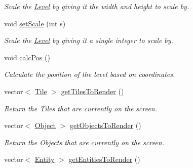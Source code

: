 \begin{DoxyCompactItemize}
\begin{DoxyCompactList}\small\item\em Scale the \hyperlink{classLevel}{Level} by giving it the width and height to scale by. \end{DoxyCompactList}\item 
void \hyperlink{classLevel_af6fe8bc2dd6623fcbaa739403a239d77}{set\+Scale} (int s)\hypertarget{classLevel_af6fe8bc2dd6623fcbaa739403a239d77}{}\label{classLevel_af6fe8bc2dd6623fcbaa739403a239d77}

\begin{DoxyCompactList}\small\item\em Scale the \hyperlink{classLevel}{Level} by giving it a single integer to scale by. \end{DoxyCompactList}\item 
void \hyperlink{classLevel_a02e915f95e181dcfe95553e923a73a39}{calc\+Pos} ()\hypertarget{classLevel_a02e915f95e181dcfe95553e923a73a39}{}\label{classLevel_a02e915f95e181dcfe95553e923a73a39}

\begin{DoxyCompactList}\small\item\em Calculate the position of the level based on coordinates. \end{DoxyCompactList}\item 
vector$<$ \hyperlink{classTile}{Tile} $>$ \hyperlink{classLevel_ade9e45f70f2f3f81c120bb161f87218f}{get\+Tiles\+To\+Render} ()\hypertarget{classLevel_ade9e45f70f2f3f81c120bb161f87218f}{}\label{classLevel_ade9e45f70f2f3f81c120bb161f87218f}

\begin{DoxyCompactList}\small\item\em Return the Tiles that are currently on the screen. \end{DoxyCompactList}\item 
vector$<$ \hyperlink{classObject}{Object} $>$ \hyperlink{classLevel_a80d185e702151c5b5764c1cadcd9064d}{get\+Objects\+To\+Render} ()\hypertarget{classLevel_a80d185e702151c5b5764c1cadcd9064d}{}\label{classLevel_a80d185e702151c5b5764c1cadcd9064d}

\begin{DoxyCompactList}\small\item\em Return the Objects that are currently on the screen. \end{DoxyCompactList}\item 
vector$<$ \hyperlink{classEntity}{Entity} $>$ \hyperlink{classLevel_a1a95e314e19e1fdba6850e9aa8da856e}{get\+Entities\+To\+Render} ()\hypertarget{classLevel_a1a95e314e19e1fdba6850e9aa8da856e}{}\label{classLevel_a1a95e314e19e1fdba6850e9aa8da856e}


\end{DoxyCompactItemize}
